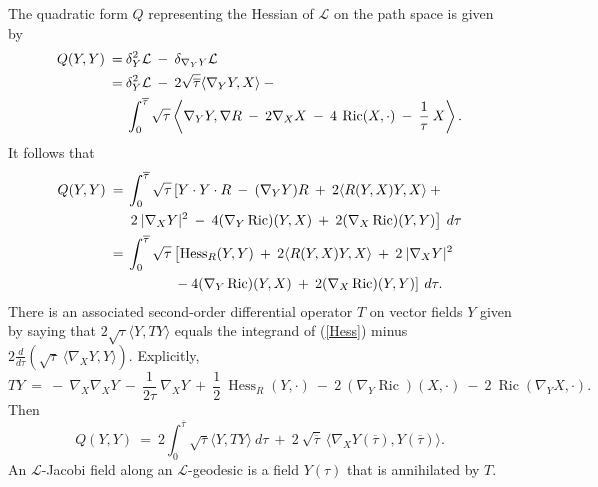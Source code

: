 \documentclass[12pt]{amsart}
\newcommand{\Hess}{\operatorname{Hess}}
\newcommand{\Ric}{\operatorname{Ric}}
\numberwithin{equation}{section}
\theoremstyle{plain}
\theoremstyle{definition}
\theoremstyle{remark}
\begin{document}
The quadratic form $Q$ representing the Hessian of ${\mathcal L}$ on the
path space is given by
\begin{align}
Q(Y, Y) \:  = \: & \delta_Y^2 {\mathcal L} \: - \: \delta_{\nabla_Y Y} 
{\mathcal L} \\
= \:
& \delta_Y^2 {\mathcal L} \: - \: 
2 \sqrt{\overline{\tau}} \langle \nabla_Y Y, X \rangle \: 
-  \notag \\
& \int_0^{\overline{\tau}}
\sqrt{\tau} \left\langle \nabla_Y Y,
\nabla R
\: - \: 2 \nabla_X X  \: - \: 4 \: \Ric(X, \cdot) \: -\: \frac{1}{\tau}
\: X
\right\rangle. \notag
\end{align}
It follows that
\begin{align} \label{Hess}
Q(Y, Y) \: = \: &
\int_0^{\overline{\tau}}
\sqrt{\tau} \left[ Y \cdot Y \cdot R \: - \: (\nabla_Y Y) R \: + \: 
2 \langle R(Y, X) Y, X \rangle \: + \right. \\
& \left. 2 \: |\nabla_X Y|^2 
\: - \: 4 (\nabla_Y \Ric) (Y, X) \: + \: 2
(\nabla_X \Ric) (Y, Y) \right] \: d\tau \notag \\
= \: & \int_0^{\overline{\tau}}
\sqrt{\tau} \left[\Hess_R (Y,Y) \: + \: 
2 \langle R(Y, X) Y, X \rangle \: + \: 2 \: |\nabla_X Y|^2 \right. \notag \\
&
\: \: \: \: \: \: \: \: \: \: \: \: \: \: \:
 \left. - \: 4 (\nabla_Y \Ric) (Y, X) \: + \: 2
(\nabla_X \Ric) (Y, Y) \right] \: d\tau. \notag 
\end{align}
There is an associated second-order differential 
operator $T$ on vector fields $Y$ given by saying that
$2 \sqrt{\tau} \langle Y, TY\rangle$ equals the integrand of (\ref{Hess}) minus
$2 \frac{d}{d\tau} \left( \sqrt{\tau} \: \langle \nabla_X Y, Y \rangle 
\right)$.
Explicitly,
\begin{equation}
TY \: = \: - \: \nabla_X \nabla_X Y \: - \: \frac{1}{2\tau} \: \nabla_X Y
\: + \: \frac12 \: \Hess_R(Y, \cdot) \: - \: 2 \: (\nabla_Y \Ric)(X, \cdot)
\: - \: 2 \: \Ric(\nabla_Y X, \cdot).
\end{equation}
Then
\begin{equation} \label{Qeqn}
Q(Y, Y) \: = \: 2 \int_0^{\overline{\tau}}
\sqrt{\tau} \langle Y, TY \rangle \: d\tau \: + \:
2 \: \sqrt{\overline{\tau}} \: \langle \nabla_X Y(\overline{\tau}),
Y(\overline{\tau}) \rangle.
\end{equation}
An ${\mathcal L}$-Jacobi field along an ${\mathcal L}$-geodesic
is a field $Y(\tau)$ that is annihilated by $T$. 
\end{document}
